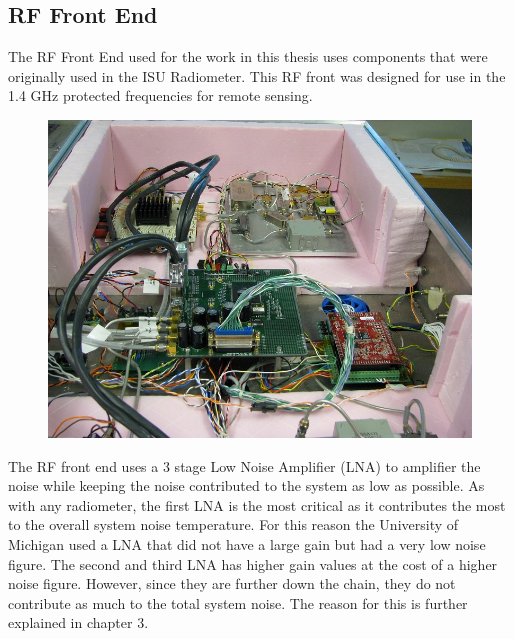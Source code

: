 \subsection{RF Front End}
The RF Front End used for the work in this thesis uses components that were originally used in the ISU Radiometer.  This RF front was designed for use in the 1.4 GHz protected frequencies for remote sensing.  

{\begin{figure}[h!tb] 
\centering
\includegraphics{Images/IMG_0027}
\label{ISU_Rad}
\end{figure}
}
The RF front end uses a 3 stage Low Noise Amplifier (LNA) to amplifier the noise while keeping the noise contributed to the system as low as possible.  As with any radiometer, the first LNA is the most critical as it contributes the most to the overall system noise temperature.  For this reason the University of Michigan used a LNA that did not have a large gain but had a very low noise figure. The second and third LNA has higher gain values at the cost of a higher noise figure.  However, since they are further down the chain, they do not contribute as much to the total system noise.  The reason for this is further explained in chapter 3.  


